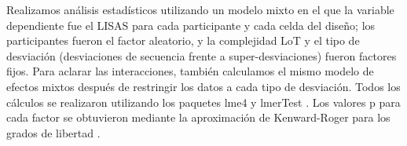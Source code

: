 Realizamos análisis estadísticos utilizando un modelo mixto en el que la variable dependiente fue el LISAS para cada participante y cada celda del diseño; los participantes fueron el factor aleatorio, y la complejidad LoT y el tipo de desviación (desviaciones de secuencia frente a super-desviaciones) fueron factores fijos. Para aclarar las interacciones, también calculamos el mismo modelo de efectos mixtos después de restringir los datos a cada tipo de desviación. Todos los cálculos se realizaron utilizando los paquetes lme4 \cite{f137} y lmerTest \cite{f138}. Los valores p para cada factor se obtuvieron mediante la aproximación de Kenward-Roger para los grados de libertad \cite{f139}.


